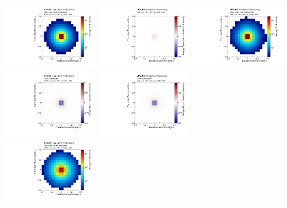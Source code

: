 \begin{figure}[htpb]
\begin{center}
\includegraphics[width=0.31\textwidth]{figures/CNN/quark_truth.pdf}
\includegraphics[width=0.31\textwidth]{figures/CNN/diff_quark_truth_track.pdf}
\includegraphics[width=0.31\textwidth]{figures/CNN/quark_track.pdf}\\
\includegraphics[width=0.31\textwidth]{figures/CNN/diff_truth.pdf}\hspace{54mm}
\includegraphics[width=0.31\textwidth]{figures/CNN/diff_track.pdf}\\
\includegraphics[width=0.31\textwidth]{figures/CNN/gluon_truth.pdf}

\end{center}
\end{figure}
